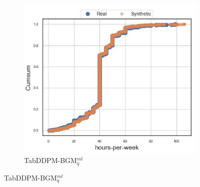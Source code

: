 \begin{figure}[H]
\begin{subfigure}{0.3\textwidth}
	\end{subfigure}
	\begin{subfigure}{0.3\textwidth}
		\centering
		\includegraphics[width=\textwidth]{images/cdf_hpw/tab-ddpm-bgm.jpg}
		\caption{TabDDPM-BGM$^{ml}_q$}
	\end{subfigure}



\end{figure}
